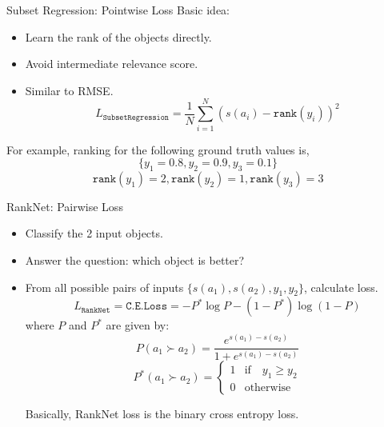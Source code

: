\documentclass{beamer}
\begin{document}
\begin{frame}[t]{Subset Regression: Pointwise Loss}
Basic idea:~\cite{subsetregressionpaper}
\begin{itemize}
\item Learn the rank of the objects directly.
\item Avoid intermediate relevance score.
\item Similar to RMSE.
$$
L_{\texttt{SubsetRegression}} = \frac{1}{N} \sum\limits_{i=1}^{N} (s(a_i) - \texttt{rank}(y_i))^2
$$
\end{itemize}


For example,  ranking for the following ground truth values is, 
$$
\{y_1 = 0.8, y_2 = 0.9, y_3 = 0.1\}
$$
$$
\texttt{rank}(y_1) = 2,  \texttt{rank}(y_2) = 1,  \texttt{rank}(y_3) = 3
$$

\end{frame}

\begin{frame}[t]{RankNet: Pairwise Loss}

\begin{itemize}
\item Classify the 2 input objects.
\item Answer the question: which object is better?
\item From all possible pairs of inputs $\{s(a_1), s(a_2), y_1, y_2\}$,  calculate loss.
$$
L_{\texttt{RankNet}} = \texttt{C.E.Loss} = -P^*\log P - (1 - P^*)\log(1-P)
$$
where $P$ and $P^*$ are given by:
$$
P(a_1 \succ a_2) = \frac{e^{s(a_1) - s(a_2)}}{1 + e^{s(a_1) - s(a_2)} }
$$
$$
P^*(a_1 \succ a_2) =
\begin{cases}
      1 & \text{if} \quad y_1 \geq y_2 \\
      0 &  \text{otherwise}
\end{cases}       
$$

Basically,  RankNet loss is the binary cross entropy loss.
\end{itemize}


\end{frame}
\end{document}
